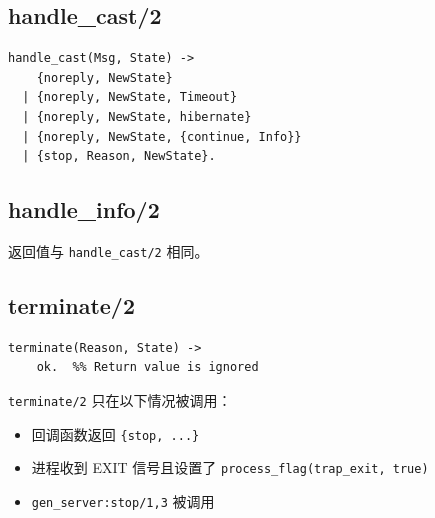 \documentclass[a4paper,11pt]{article}
\begin{document}
\subsection{handle\_cast/2}

\begin{lstlisting}[style=erlangstyle]
handle_cast(Msg, State) ->
    {noreply, NewState}
  | {noreply, NewState, Timeout}
  | {noreply, NewState, hibernate}
  | {noreply, NewState, {continue, Info}}
  | {stop, Reason, NewState}.
\end{lstlisting}

\subsection{handle\_info/2}

返回值与 \texttt{handle\_cast/2} 相同。

\subsection{terminate/2}

\begin{lstlisting}[style=erlangstyle]
terminate(Reason, State) ->
    ok.  %% Return value is ignored
\end{lstlisting}

\begin{warnbox}[注意]
\texttt{terminate/2} 只在以下情况被调用：
\begin{itemize}
    \item 回调函数返回 \texttt{\{stop, ...\}}
    \item 进程收到 EXIT 信号且设置了 \texttt{process\_flag(trap\_exit, true)}
    \item \texttt{gen\_server:stop/1,3} 被调用
\end{itemize}
\end{warnbox}
\end{document}
